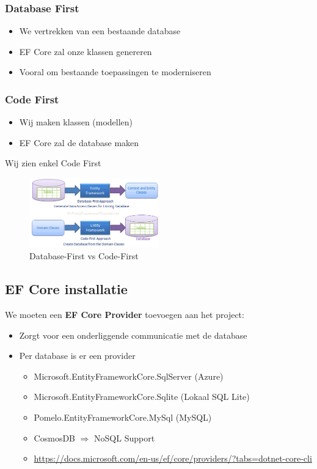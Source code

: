 \documentclass{article}
\begin{document}
\subsubsection{Database First}

\begin{itemize}
    \item We vertrekken van een bestaande database
    \item EF Core zal onze klassen genereren
    \item Vooral om bestaande toepassingen te moderniseren
\end{itemize}

\subsubsection{Code First}

\begin{itemize}
    \item Wij maken klassen (modellen)
    \item EF Core zal de database maken
\end{itemize}

Wij zien enkel Code First

\begin{figure}[H]
    \centering
    \includegraphics[width=0.5\textwidth]{database-code-first.png}
    \caption{Database-First vs Code-First}
\end{figure}

\subsection{EF Core installatie}

We moeten een \textbf{EF Core Provider} toevoegen aan het project:

\begin{itemize}
    \item Zorgt voor een onderliggende communicatie met de database
    \item Per database is er een provider
    \begin{itemize}
        \item Microsoft.EntityFrameworkCore.SqlServer (Azure)
        \item Microsoft.EntityFrameworkCore.Sqlite (Lokaal SQL Lite)
        \item Pomelo.EntityFrameworkCore.MySql (MySQL)
        \item CosmosDB $\Rightarrow$ NoSQL Support
        \item \url{https://docs.microsoft.com/en-us/ef/core/providers/?tabs=dotnet-core-cli}
    \end{itemize}
\end{itemize}
\end{document}

